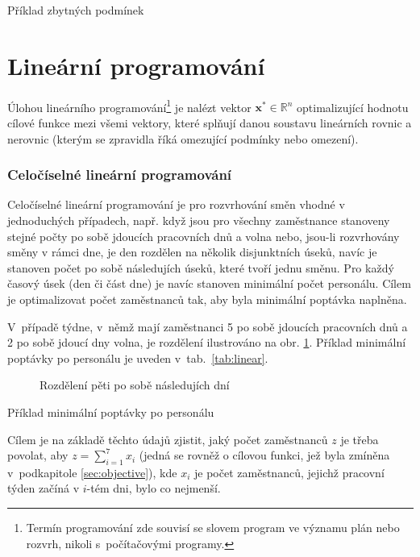 \documentclass[twoside]{ctuthesis}
\begin{document}
\begin{enumerate}[label=\textbf{O\arabic*.}]
\begin{table}[h]
	\caption{Příklad zbytných podmínek}
	\label{tab:soft}
\end{table}


\section{Lineární programování}
Úlohou lineárního programování\footnote{Termín programování zde souvisí se slovem program ve významu plán nebo rozvrh, nikoli s~počítačovými programy. } je nalézt vektor $\boldsymbol{x}^{\ast} \in \mathbb{R}^n$ optimalizující hodnotu cílové funkce mezi všemi vektory, které splňují danou soustavu lineárních rovnic a nerovnic (kterým se zpravidla říká omezující podmínky nebo omezení). \cite{matousek2006linearni}

\subsubsection{Celočíselné lineární programování}

Celočíselné lineární programování je pro rozvrhování směn vhodné v jed\-no\-du\-chých případech, např. když jsou pro všechny zaměstnance stanoveny stejné počty po sobě jdoucích pracovních dnů a volna nebo, jsou-li rozvrhovány směny v rámci dne, je den rozdělen na několik disjunktních úseků, navíc je stanoven počet po sobě následujích úseků, které tvoří jednu směnu. Pro každý časový úsek (den či část dne) je navíc stanoven minimální počet personálu. \cite{satheeshkumar2014linear} Cílem je optimalizovat počet zaměstnanců tak, aby byla minimální poptávka naplněna.

V~případě týdne, v~němž mají zaměstnanci 5 po sobě jdoucích pracovních dnů a 2 po sobě jdoucí dny volna, je rozdělení ilustrováno na obr. \ref{fig:linear}. Příklad minimální poptávky po personálu je uveden v~tab.~\ref{tab:linear}.

\begin{figure}[h]
	
	\caption{Rozdělení pěti po sobě následujích dní}
	\label{fig:linear}
\end{figure}

\begin{table}[h]
	
	\caption{Příklad minimální poptávky po personálu}
	\label{tab:linear}
\end{table}

Cílem je na základě těchto údajů zjistit, jaký počet zaměstnanců $z$ je třeba povolat, aby $z = \sum_{i=1}^{7} x_i$ (jedná se rovněž o cílovou funkci, jež byla zmíněna v~podkapitole \ref{sec:objective}), kde $x_i$ je počet zaměstnanců, jejichž pracovní týden začíná v $i$-tém dni, bylo co nejmenší.


\end{enumerate}
\end{document}
